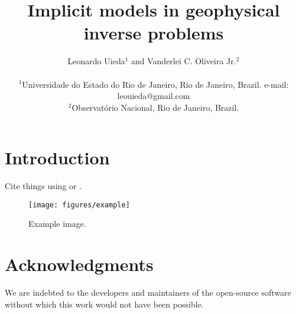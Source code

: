 \documentclass[twocolumn]{article}
\begin{document}
\title{
Implicit models in geophysical inverse problems
}
\author{
    Leonardo Uieda$^{1}$
    and
    Vanderlei C. Oliveira Jr.$^{2}$
    \\\\
    {\small
        $^1$Universidade do Estado do Rio de Janeiro, Rio de Janeiro, Brazil.
        e-mail: leouieda@gmail.com
    }
    \\
    {\small
        $^2$Observatório Nacional, Rio de Janeiro, Brazil.
    }
}


\maketitle


\begin{abstract}
    \lipsum[1]
\end{abstract}


\section{Introduction}

Cite things using \citet{tikhonov1977} or \citep{tikhonov1977}.

\begin{figure}
    \centering
    \texttt{[image: figures/example]}
    \caption{
        Example image.
    }
    \label{fig:meh}
\end{figure}


\section{Acknowledgments}

We are indebted to the developers and maintainers of the open-source
software without which this work would not have been possible.




\end{document}
